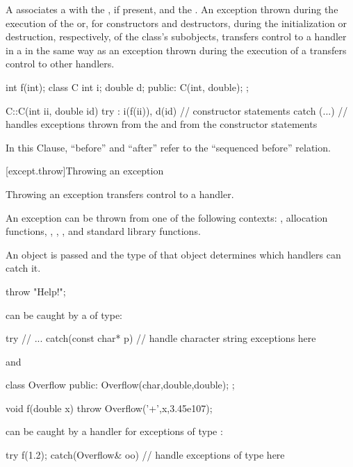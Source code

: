 \pnum
{}%
%
A
associates a
with the
,
if present, and the
.
An exception
thrown during the execution of the
or, for constructors and destructors, during the initialization or
destruction, respectively, of the class's subobjects,
transfers control to a handler in a
in the same way as an exception thrown during the execution of a
transfers control to other handlers.
\begin{example}
\begin{codeblock}
int f(int);
class C {
  int i;
  double d;
public:
  C(int, double);
};

C::C(int ii, double id)
try : i(f(ii)), d(id) {
    // constructor statements
} catch (...) {
    // handles exceptions thrown from the  and from the constructor statements
}
\end{codeblock}
\end{example}

\pnum
In this Clause, ``before'' and ``after'' refer to the
``sequenced before'' relation.

[except.throw]{Throwing an exception}%
%

\pnum
Throwing an exception transfers control to a handler.
\begin{note}
An exception can be thrown from one of the following contexts:
,
allocation functions,
,
,
, and standard library
functions.
\end{note}
An object is passed and the type of that object determines which handlers
can catch it.
\begin{example}
\begin{codeblock}
throw "Help!";
\end{codeblock}
can be caught by a
of
type:
\begin{codeblock}
try {
    // ...
} catch(const char* p) {
    // handle character string exceptions here
}
\end{codeblock}
and
\begin{codeblock}
class Overflow {
public:
    Overflow(char,double,double);
};

void f(double x) {
    throw Overflow('+',x,3.45e107);
}
\end{codeblock}
can be caught by a handler for exceptions of type
:
\begin{codeblock}
try {
    f(1.2);
} catch(Overflow& oo) {
    // handle exceptions of type  here
}
\end{codeblock}
\end{example}


